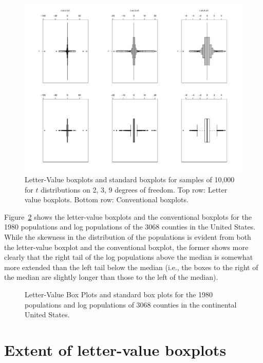 \documentclass[oneside]{article}
\begin{document}
\begin{figure}[hbtp]
  \centering
  \includegraphics[width = 0.75\linewidth]{tplot2kk}

  \caption{Letter-Value boxplots and standard boxplots for samples of 10,000
  for $t$ distributions on 2, 3, 9 degrees of freedom. Top row: Letter value
  boxplots. Bottom row: Conventional boxplots.}
  \label{t-dist}
\end{figure}

Figure~\ref{lvpops} shows the letter-value boxplots and the conventional boxplots for the 1980 populations and log populations of the 3068 counties in the United States. While the skewness in the distribution of the populations is evident from both the letter-value boxplot and the conventional boxplot, the former shows more clearly that the right tail of the log populations above the median is somewhat more extended than the left tail below the median (i.e., the boxes to the right of the median are slightly longer than those to the left of the median).

\begin{figure}[hbtp]
  \centering

  \caption{Letter-Value Box Plots and standard box plots for the 1980
  populations and log populations of 3068 counties in the continental United
  States.}
  \label{lvpops} 
\end{figure}

\section{Extent of letter-value boxplots}
\label{sec:extent}
\end{document}
